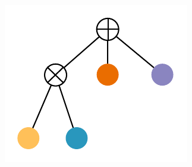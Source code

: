 \documentclass[final]{beamer}
\begin{document}
\begin{frame}{}
\begin{textblock}{60}
{\begin{minipage}[t]{6.48cm}
      \includegraphics[width=\linewidth]{figures/learnspn-2}
    \end{minipage}}\hspace{30pt}\begin{minipage}[t]{4.6364cm}

\end{minipage}
\end{textblock}
\end{frame}
\end{document}
